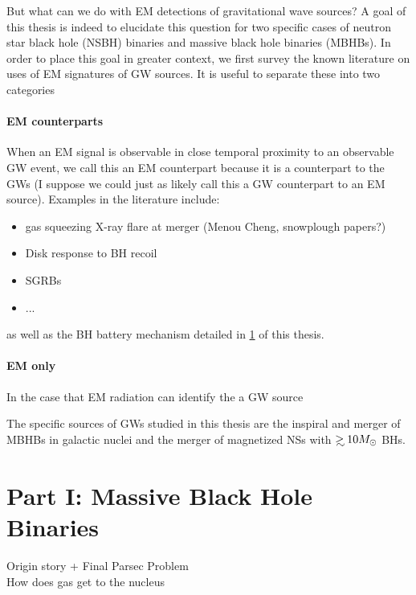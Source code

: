 But what can we do with EM detections of gravitational wave sources? A goal of this thesis is indeed to elucidate this question for two specific cases of neutron star black hole (NSBH) binaries and massive black hole binaries (MBHBs). In order to place this goal in greater context, we first survey the known literature on uses of EM signatures of GW sources. It is useful to separate these into two categories

\paragraph{EM counterparts} When an EM signal is observable in close temporal proximity to an observable GW event, we call this an EM counterpart because it is a counterpart to the GWs (I suppose we could just as likely call this a GW counterpart to an EM source). Examples in the literature include:
\begin{itemize}
\item gas squeezing X-ray flare at merger (Menou Cheng, snowplough papers?)
\item Disk response to BH recoil
\item SGRBs
\item ...
\end{itemize}
as well as the BH battery mechanism detailed in \ref{} of this thesis.

\paragraph{EM only} In the case that EM radiation can identify the a GW source 

 






The specific sources of GWs studied in this thesis are the inspiral and merger of MBHBs in galactic nuclei and the merger of magnetized NSs with $\gsim 10 \Msun$ BHs.
\section{Part I: Massive Black Hole Binaries}
Origin story + Final Parsec Problem\\

How does gas get to the nucleus\\

